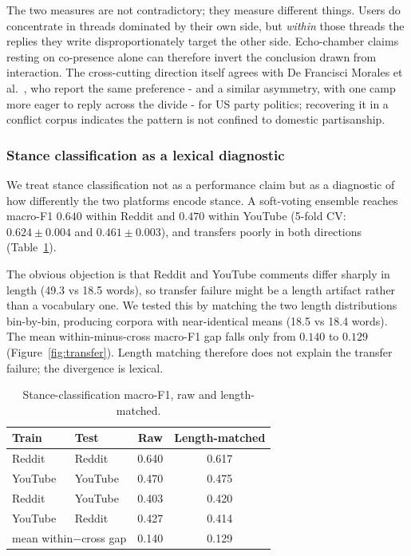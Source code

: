 \documentclass[pdflatex,sn-basic,Numbered,iicol]{sn-jnl}
\begin{document}
The two measures are not contradictory; they measure different things. Users do
concentrate in threads dominated by their own side, but \emph{within} those threads
the replies they write disproportionately target the other side. Echo-chamber claims
resting on co-presence alone can therefore invert the conclusion drawn from
interaction. The cross-cutting direction itself agrees with De Francisci Morales
et al.~\cite{defrancisci2021}, who report the same preference - and a similar
asymmetry, with one camp more eager to reply across the divide - for US party
politics; recovering it in a conflict corpus indicates the pattern is not confined
to domestic partisanship.

\subsubsection{Stance classification as a lexical diagnostic}
We treat stance classification not as a performance claim but as a diagnostic of how
differently the two platforms encode stance. A soft-voting ensemble reaches macro-F1
$0.640$ within Reddit and $0.470$ within YouTube (5-fold CV: $0.624\pm0.004$ and
$0.461\pm0.003$), and transfers poorly in both directions (Table~\ref{tab:ml}).

The obvious objection is that Reddit and YouTube comments differ sharply in length
(49.3 vs 18.5 words), so transfer failure might be a length artifact rather than a
vocabulary one. We tested this by matching the two length distributions bin-by-bin,
producing corpora with near-identical means (18.5 vs 18.4 words). The mean
within-minus-cross macro-F1 gap falls only from $0.140$ to $0.129$
(Figure~\ref{fig:transfer}). Length matching therefore does not explain the transfer
failure; the divergence is lexical.

\begin{table}[t]
  \centering
  \footnotesize
  \setlength{\tabcolsep}{3pt}
  \caption{Stance-classification macro-F1, raw and length-matched.}
  \label{tab:ml}
  \begin{tabular}{@{}llcc@{}}
    \toprule
    Train & Test & Raw & Length-matched \\
    \midrule
    Reddit  & Reddit  & 0.640 & 0.617 \\
    YouTube & YouTube & 0.470 & 0.475 \\
    Reddit  & YouTube & 0.403 & 0.420 \\
    YouTube & Reddit  & 0.427 & 0.414 \\
    \midrule
    \multicolumn{2}{l}{mean within$-$cross gap} & 0.140 & 0.129 \\
    \bottomrule
  \end{tabular}
\end{table}
\end{document}
